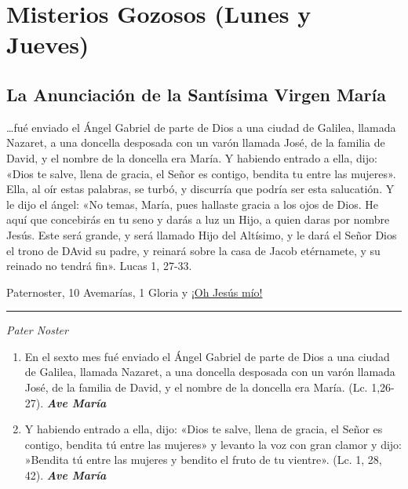\documentclass[a4paper,11pt, oneside]{report}
\begin{document}
\section*{Misterios Gozosos (Lunes y Jueves)}\label{sec:gozosos}
{  
  \subsection*{La Anunciación de la Santísima Virgen María}
  {
    {\ldots}fué enviado el Ángel Gabriel de parte de Dios a una ciudad de Galilea, llamada Nazaret, a una doncella desposada con un varón llamada José, 
    de la familia de David, y el nombre de la doncella era María. Y habiendo entrado a ella, dijo: «Dios te salve, llena de gracia, el Señor es contigo, 
    bendita tu entre las mujeres». Ella, al oír estas palabras, se turbó, y discurría que podría ser esta salucatión. 
    Y le dijo el ángel: «No temas, María, pues hallaste gracia a los ojos de Dios. He aquí que concebirás en tu seno y darás a luz un Hijo, a quien 
    daras por nombre Jesús. Este será grande, y será llamado Hijo del Altísimo, y le dará el Señor Dios el trono de DAvid su padre, y reinará sobre 
    la casa de Jacob etérnamete, y su reinado no tendrá fin». Lucas 1, 27-33.
    
     Paternoster, 10 Avemarías, 1 Gloria y \hyperlink{finalAnunciacion}{¡Oh Jesús mío!}
    
    \medskip

    \begin{center}\rule{1\linewidth}{\linethickness}\end{center}

    \medskip

    \textit{Pater Noster}
      
    \begin{enumerate}
      \item En el sexto mes fué enviado el Ángel Gabriel de parte de Dios a una ciudad de Galilea, llamada Nazaret, a una 
      doncella desposada con un varón llamada José, de la familia de David, y el nombre de la doncella era María. (Lc. 1,26- 27). \textbf{\textit{Ave María}}

      \item Y habiendo entrado a ella, dijo: «Dios te salve, llena de gracia, el Señor es contigo, bendita tú entre las mujeres»
      y levanto la voz con gran clamor y dijo: »Bendita tú entre las mujeres y bendito el fruto de tu vientre». (Lc. 1, 28, 42). \textbf{\textit{Ave María}}


\end{enumerate}}}
\end{document}
